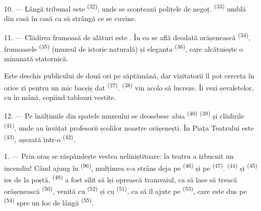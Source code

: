 10. --- Lângă tribunal este  \textsuperscript{(32)}, unde se
scontează polițele de negoț.  \textsuperscript{(33)}
umblă din casă în casă ca să strângă ce se cuvine.

\VUsaut{4.0mm}
\VUsaut{3.4mm}

11. --- Clădirea frumoasă de alături este . În ea se află deodată
 orășenească \textsuperscript{(34)}, frumoasele
 \textsuperscript{(35)} (muzeul de istorie
naturală) și eleganta  \textsuperscript{(36)}, care alcătuiește
o minunată  statornică.

Este deschis publicului de două ori pe săptămână, dar vizitatorii îl pot cerceta
în orice zi pentru un mic bacșiș dat  \textsuperscript{(37)}.
 \textsuperscript{(38)} vin acolo să lucreze. Îi vezi
 șevaletelor, cu  în mână, copiind tablouri
vestite.

12. --- Pe înălțimile din spatele muzeului se deosebesc abia 
\textsuperscript{(40)}  \textsuperscript{(39)} și clădirile
 \textsuperscript{(41)}, unde au învățat profesorii școlilor
noastre orășenești. În Piața Teatrului este 
\textsuperscript{(43)}, așezată într-o 
\textsuperscript{(42)}.

\VUsaut{5.0mm}
\VUsaut{3.0mm}

\VUsaut{3.4mm}

1. --- Prin oraș se răspândește vestea neliniștitoare: la teatru a izbucnit un
incendiu! Când ajung în  \textsuperscript{(96)}, mulțimea s-a strâns
deja pe  \textsuperscript{(46)} și pe 
\textsuperscript{(47)}.  \textsuperscript{(44)} și
 \textsuperscript{(45)} ies de la poștă. 
\textsuperscript{(48)} a fost silit să își oprească tramvaiul, ca să lase să treacă
 orășenească \textsuperscript{(50)}, venită cu
 \textsuperscript{(52)} și cu 
\textsuperscript{(51)}, ca să îl ajute pe  \textsuperscript{(53)},
care este dus pe  \textsuperscript{(54)} spre un loc de lângă
 \textsuperscript{(55)}.

